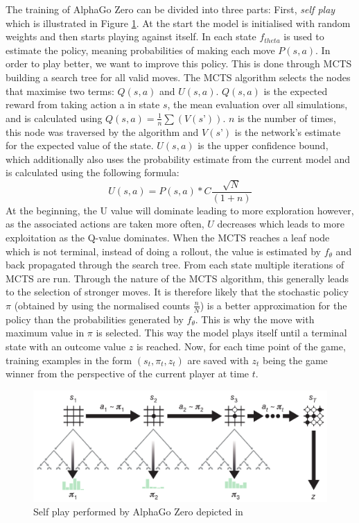 \documentclass[12pt,a4paper]{article}
\begin{document}
{The training of AlphaGo Zero can be divided into three parts: First, \emph{self play} which is illustrated in Figure \ref{fig:selfplay}. At the start the model is initialised with random weights and then starts playing against itself. In each state $f_{theta}$ is used to estimate the policy, meaning probabilities of making each move $P(s,a)$. In order to play better, we want to improve this policy. This is done through MCTS building a search tree for all valid moves. The MCTS algorithm selects the nodes that maximise two terms: $Q(s,a)$ and $U(s,a)$. $Q(s,a)$ is the expected reward from taking action a in state $s$, the mean evaluation over all simulations, and is calculated using $Q(s,a) = \frac{1}{n}\sum(V(s’))$. $n$ is the number of times, this node was traversed by the algorithm and $V(s’)$ is the network's estimate for the expected value of the state. $U(s,a)$ is the upper confidence bound, which additionally also uses the probability estimate from the current model and is calculated using the following formula:
$$U(s,a) = P(s,a) *C\frac{\sqrt{N}}{(1+n)}$$
At the beginning, the U value will dominate leading to more exploration however, as the associated actions are taken more often, $U$ decreases which leads to more exploitation as the Q-value dominates. When the MCTS reaches a leaf node which is not terminal, instead of doing a rollout, the value is estimated by $f_\theta$ and back propagated through the search tree. From each state multiple iterations of MCTS are run. Through the nature of the MCTS algorithm, this generally leads to the selection of stronger moves. It is therefore likely that the stochastic policy $\pi$ (obtained by using the normalised counts $\frac{n}{N}$) is a better approximation for the policy than the probabilities generated by $f_\theta$. This is why the move with maximum value in $\pi$ is selected. This way the model plays itself until a terminal state with an outcome value $z$ is reached. Now, for each time point of the game, training examples in the form $(s_t,\pi_t,z_t)$ are saved with $z_t$ being the game winner from the perspective of the current player at time $t$.

\begin{figure}
  \includegraphics[width=\linewidth]{img/selfplay.png}
  \centering 
  \caption{Self play performed by AlphaGo Zero depicted in \citet{silver_mastering_2017}}
  \label{fig:selfplay}
\end{figure}

}
\end{document}

